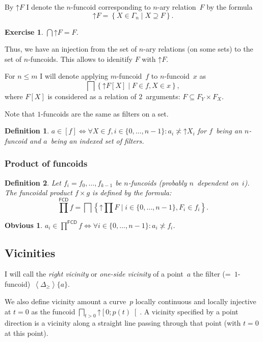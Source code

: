 \documentclass[oneside,draft]{amsart}
\newcommand{\setcond}[2]{\left\{#1\mid#2\right\}}
\newcommand{\intrs}{\not\asymp}
\newcommand{\funcoids}{\mathsf{FCD}}
\newcommand{\supfun}[1]{\left\langle#1\right\rangle}
\newcommand{\suprel}[1]{\left[#1\right]}
\newtheorem{obvious}{Obvious}
\newtheorem{defn}{Definition}
\newtheorem{exer}{Exercise}
\begin{document}
By $\mathord{\uparrow}F$ I denote the $n$-fun\-co\-id corresponding to $n$-ary relation~$F$ by the formula
\[ \mathord{\uparrow}F = \setcond{X\in\Gamma_n}{X\supseteq F}. \]

\begin{exer}
$\bigcap\mathord{\uparrow}F = F$.
\end{exer}

Thus, we have an injection from the set of $n$-ary relations (on some sets) to the set of $n$-fun\-co\-ids.
This allows to idenitify $F$ with $\mathord{\uparrow}F$.

For $n\leq m$ I will denote applying $m$-fun\-co\-id~$f$ to $n$-fun\-co\-id~$x$ as
\[ \bigsqcap\setcond{\mathord{\uparrow} F[X]}{F\in f,X\in x}, \]
where $F[X]$ is considered as a relation of $2$~arguments: $F\subseteq F_Y\times F_X$.

Note that $1$-fun\-co\-ids are the same as filters on a set.

\begin{defn}
$a\in\suprel{f} \Leftrightarrow \forall X\in f, i\in\{0,\dots,n-1\}: a_i \intrs \mathord{\uparrow}X_i$ for $f$~being an $n$-fun\-co\-id and $a$~being an indexed set of filters.
\end{defn}

\subsubsection{Product of funcoids}

\begin{defn}
Let $f_i = f_0,\dots,f_{k-1}$ be $n$-fun\-co\-ids (probably $n$~dependent on~$i$). The \emph{funcoidal product} $f\times g$ is defined by the formula:
\[
\prod^{\funcoids}f = \bigsqcap\setcond{\mathord{\uparrow}\prod F}{i\in\{0,\dots,n-1\}, F_i\in f_i}.
\]
\end{defn}

\begin{obvious}
$a_i\in\prod^{\funcoids}f \Leftrightarrow \forall i\in\{0,\dots,n-1\}: a_i\intrs f_i$.
\end{obvious}

\subsection{Vicinities}

I will call the \emph{right vicinity} or \emph{one-si\-de vicinity} of a point~$a$ the filter (=~$1$-fun\-co\-id)~$\supfun{\Delta_{\geq}}\{a\}$.

We also define vicinity amount a curve~$p$ locally continuous and locally injective at $t=0$ as the funcoid $\bigsqcap_{t>0}\mathord{\uparrow}\left[0;p(t)\right[$. A vicinity specified by a point direction is a vicinity along a straight line passing through that point (with $t=0$ at this point).
\end{document}
